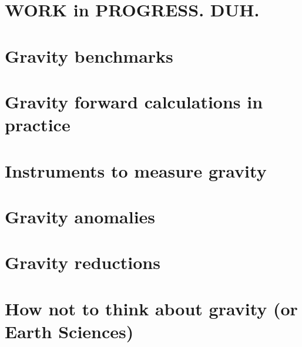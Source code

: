 \newpage
\section{WORK in PROGRESS. DUH.} %

\section{Gravity benchmarks} 

\newpage
\section{Gravity forward calculations in practice} 
\section{Instruments to measure gravity} 
\section{Gravity anomalies} 
\section{Gravity reductions} 
\section{How not to think about gravity (or Earth Sciences)} 
